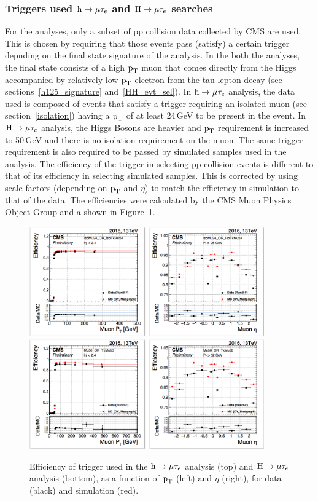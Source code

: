 \subsubsection{Triggers used $\text{h} \to \mu \tau_{e}$ and $\text{H} \to \mu \tau_{e}$ searches}
\label{anal_trigger}
For the analyses, only a subset of pp collision data collected by CMS are used. This is chosen by requiring that those events pass (satisfy) a certain trigger depnding on the final state signature of the analysis. In the both the analyses, the final state consists of a high $\text{p}_\text{T}$ muon that comes directly from the Higgs accompanied by relatively low $\text{p}_\text{T}$ electron from the tau lepton decay (see sections~\ref{h125_signature} and~\ref{HH_evt_sel}). In $\text{h} \to \mu \tau_{e}$ analysis, the data used is composed of events that satisfy a trigger requiring an isolated muon (see section~\ref{isolation}) having a $\text{p}_\text{T}$ of at least 24\,GeV to be present in the event. In $\text{H} \to \mu \tau_{e}$ analysis, the Higgs Bosons are heavier and $\text{p}_\text{T}$ requirement is increased to 50\,GeV and there is no isolation requirement on the muon. The same trigger requirement is also required to be passed by simulated samples used in the analysis. The efficiency of the trigger in selecting pp collision events is different to that of its efficiency in selecting simulated samples. This is corrected by using scale factors (depending on $\text{p}_\text{T}$ and $\eta$) to match the efficiency in simulation to that of the data. The efficiencies were calculated by the CMS Muon Physics Object Group and a shown in Figure~\ref{fig:muon_trigger}.

\begin{figure}[!htpb]\centering
 \includegraphics[width=0.9\textwidth,trim=0 -15pt 0 0,clip]{plots_and_figures/chapter3/muontrig1.png}\\
 \includegraphics[width=0.9\textwidth]{plots_and_figures/chapter3/muontrig2.png} 
\caption{Efficiency of trigger used in the $\text{h} \to \mu \tau_{e}$ analysis (top) and $\text{H} \to \mu \tau_{e}$ analysis (bottom), as a function of $\text{p}_\text{T}$ (left) and $\eta$ (right), for data (black) and simulation (red).}
 \label{fig:muon_trigger}
\end{figure}  



